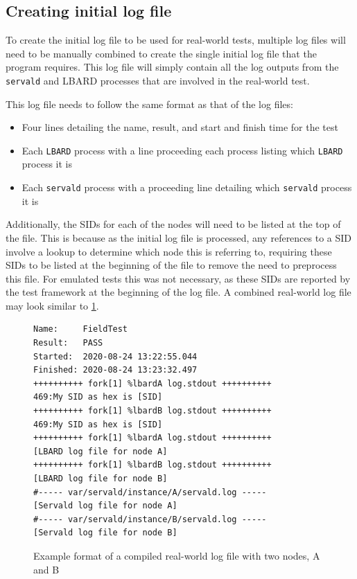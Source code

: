 \subsection{Creating initial log file}
To create the initial log file to be used for real-world tests, multiple log files will need to be manually combined to create the single initial log file that the program requires.
This log file will simply contain all the log outputs from the \texttt{servald} and LBARD processes that are involved in the real-world test.

This log file needs to follow the same format as that of the log files:
\begin{itemize}
    \item Four lines detailing the name, result, and start and finish time for the test
    \item Each \texttt{LBARD} process with a line proceeding each process listing which \texttt{LBARD} process it is
    \item Each \texttt{servald} process with a proceeding line detailing which \texttt{servald} process it is
\end{itemize} 

Additionally, the SIDs for each of the nodes will need to be listed at the top of the file. 
This is because as the initial log file is processed, any references to a SID involve a lookup to determine which node this is referring to, requiring these SIDs to be listed at the beginning of the file to remove the need to preprocess this file.
For emulated tests this was not necessary, as these SIDs are reported by the test framework at the beginning of the log file.
A combined real-world log file may look similar to \figurename{ \ref{fig:chapter6RealWorldLog}}.

\begin{figure}
    \begin{centering}
\begin{lstlisting}[basicstyle=\small, breaklines, frame=single]
Name:     FieldTest
Result:   PASS
Started:  2020-08-24 13:22:55.044
Finished: 2020-08-24 13:23:32.497
++++++++++ fork[1] %lbardA log.stdout ++++++++++
469:My SID as hex is [SID]
++++++++++ fork[1] %lbardB log.stdout ++++++++++
469:My SID as hex is [SID]
++++++++++ fork[1] %lbardA log.stdout ++++++++++
[LBARD log file for node A]
++++++++++ fork[1] %lbardB log.stdout ++++++++++
[LBARD log file for node B]
#----- var/servald/instance/A/servald.log -----
[Servald log file for node A]
#----- var/servald/instance/B/servald.log -----
[Servald log file for node B]
\end{lstlisting}
        \caption{Example format of a compiled real-world log file with two nodes, A and B}
        \label{fig:chapter6RealWorldLog}
    \end{centering}
\end{figure}

